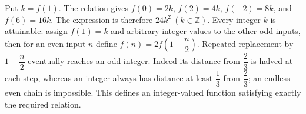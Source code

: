 Put $ k=f(1)$. The relation gives $ f(0)=2k $, $ f(2)=4k $, $ f(-2)=8k $, and $ f(6)=16k $. The expression is therefore $\boxed{24k^2\ (k\in\mathbb Z)}$. Every integer $ k $ is attainable: assign $ f(1)=k $ and arbitrary integer values to the other odd inputs, then for an even input $ n $ define $ f(n)=2f(1-\dfrac{n}{2})$. Repeated replacement by $ 1-\dfrac{n}{2}$ eventually reaches an odd integer. Indeed its distance from $\dfrac{2}{3}$ is halved at each step, whereas an integer always has distance at least $\dfrac{1}{3}$ from $\dfrac{2}{3}$; an endless even chain is impossible. This defines an integer-valued function satisfying exactly the required relation.

